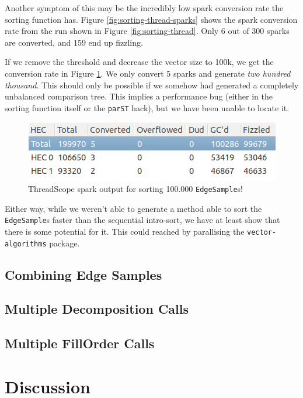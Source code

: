 \documentclass[12pt, a4paper]{article}
\begin{document}
Another symptom of this may be the incredibly low spark conversion rate the sorting function has.
Figure \ref{fig:sorting-thread-sparks} shows the spark conversion rate from the run shown in
Figure \ref{fig:sorting-thread}. Only 6 out of 300 sparks are converted, and 159 end up fizzling.


If we remove the threshold and decrease the vector size to 100k, we get the conversion rate in
Figure \ref{fig:sorting-thread-100k-sparks}. We only convert 5 sparks and generate \textit{two hundred thousand}. This should only be possible if we somehow had generated
a completely unbalanced comparison tree. This implies a performance bug (either in the sorting function
 itself or the \texttt{parST} hack), but we have been unable to locate it.
 \begin{figure}[h!]
  \centering
  \includegraphics[width=0.6\linewidth]{../threadscope/sorting/sorting-100k-sparks}
  \caption{ThreadScope spark output for sorting 100.000 \texttt{EdgeSample}s!}
  \label{fig:sorting-thread-100k-sparks}
\end{figure}

Either way, while we weren't able to generate a method able to sort the \texttt{EdgeSample}s faster
than the sequential intro-sort, we have at least show that there is some potential for it. This
 could reached by parallising the \texttt{vector-algorithms} package.
\subsection{Combining Edge Samples}

\subsection{Multiple Decomposition Calls}

\subsection{Multiple FillOrder Calls}

\section{Discussion}\label{discussion}
\end{document}
